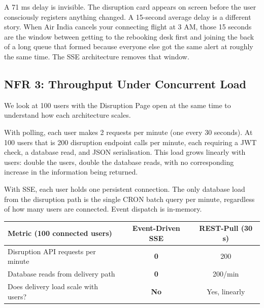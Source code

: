 \documentclass[12pt,a4paper]{article}
\begin{document}
A 71 ms delay is invisible. The disruption card appears on screen before the user consciously
registers anything changed. A 15-second average delay is a different story. When Air India
cancels your connecting flight at 3 AM, those 15 seconds are the window between getting to
the rebooking desk first and joining the back of a long queue that formed because everyone else
got the same alert at roughly the same time. The SSE architecture removes that window.

\subsection{NFR 3: Throughput Under Concurrent Load}

We look at 100 users with the Disruption Page open at the same time to understand how each
architecture scales.

With polling, each user makes 2 requests per minute (one every 30 seconds). At 100 users that
is 200 disruption endpoint calls per minute, each requiring a JWT check, a database read, and
JSON serialisation. This load grows linearly with users: double the users, double the database
reads, with no corresponding increase in the information being returned.

With SSE, each user holds one persistent connection. The only database load from the disruption
path is the single CRON batch query per minute, regardless of how many users are connected. Event
dispatch is in-memory.

\begin{center}
\begin{tabular}{@{}lcc@{}}
\toprule
\textbf{Metric (100 connected users)} & \textbf{Event-Driven SSE} & \textbf{REST-Pull (30 s)} \\
\midrule
Disruption API requests per minute & \textcolor{successgreen}{\textbf{0}} & \textcolor{warningorange}{200} \\
Database reads from delivery path & \textcolor{successgreen}{\textbf{0}} & \textcolor{warningorange}{200/min} \\
Does delivery load scale with users? & \textcolor{successgreen}{\textbf{No}} & \textcolor{warningorange}{Yes, linearly} \\
\bottomrule
\end{tabular}
\end{center}

\end{document}
